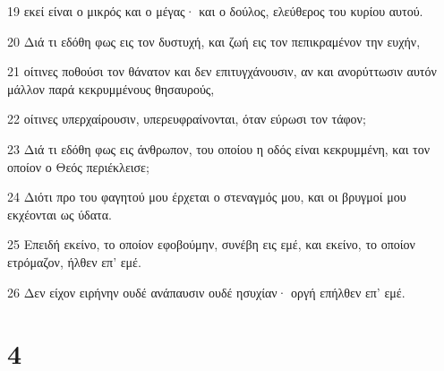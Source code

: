 \par 19 εκεί είναι ο μικρός και ο μέγας· και ο δούλος, ελεύθερος του κυρίου αυτού.
\par 20 Διά τι εδόθη φως εις τον δυστυχή, και ζωή εις τον πεπικραμένον την ευχήν,
\par 21 οίτινες ποθούσι τον θάνατον και δεν επιτυγχάνουσιν, αν και ανορύττωσιν αυτόν μάλλον παρά κεκρυμμένους θησαυρούς,
\par 22 οίτινες υπερχαίρουσιν, υπερευφραίνονται, όταν εύρωσι τον τάφον;
\par 23 Διά τι εδόθη φως εις άνθρωπον, του οποίου η οδός είναι κεκρυμμένη, και τον οποίον ο Θεός περιέκλεισε;
\par 24 Διότι προ του φαγητού μου έρχεται ο στεναγμός μου, και οι βρυγμοί μου εκχέονται ως ύδατα.
\par 25 Επειδή εκείνο, το οποίον εφοβούμην, συνέβη εις εμέ, και εκείνο, το οποίον ετρόμαζον, ήλθεν επ' εμέ.
\par 26 Δεν είχον ειρήνην ουδέ ανάπαυσιν ουδέ ησυχίαν· οργή επήλθεν επ' εμέ.

\chapter{4}


